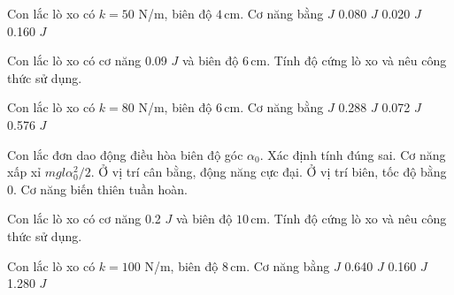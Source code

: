 \begin{ex}
Con lắc lò xo có $k=50$ N/m, biên độ $4\,\text{cm}$. Cơ năng bằng
\choice
{ $J$}
{0.080 $J$}
{0.020 $J$}
{0.160 $J$}
\end{ex}

\begin{ex}
Con lắc lò xo có cơ năng 0.09 $J$ và biên độ $6\,\text{cm}$. Tính độ cứng lò xo và nêu công thức sử dụng.
\choiceTF

\end{ex}


\begin{ex}
Con lắc lò xo có $k=80$ N/m, biên độ $6\,\text{cm}$. Cơ năng bằng
\choice
{ $J$}
{0.288 $J$}
{0.072 $J$}
{0.576 $J$}
\end{ex}

\begin{ex}
Con lắc đơn dao động điều hòa biên độ góc $\alpha_0$. Xác định tính đúng sai.
\choiceTF
{\True Cơ năng xấp xỉ $mgl\alpha_0^2/2$.}
{\True Ở vị trí cân bằng, động năng cực đại.}
{\True Ở vị trí biên, tốc độ bằng 0.}
{Cơ năng biến thiên tuần hoàn.}
\end{ex}

\begin{ex}
Con lắc lò xo có cơ năng 0.2 $J$ và biên độ $10\,\text{cm}$. Tính độ cứng lò xo và nêu công thức sử dụng.
\choiceTF

\end{ex}


\begin{ex}
Con lắc lò xo có $k=100$ N/m, biên độ $8\,\text{cm}$. Cơ năng bằng
\choice
{ $J$}
{0.640 $J$}
{0.160 $J$}
{1.280 $J$}
\end{ex}

